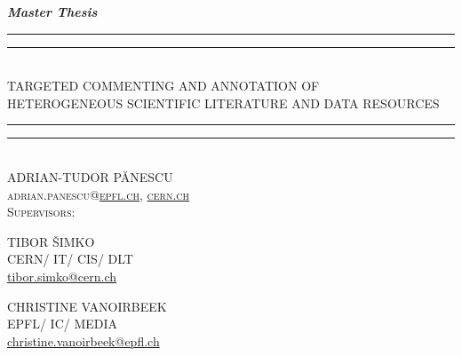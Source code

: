 
\begin{titlepage}
  \centering
  \vspace*{5\baselineskip}
  \textbf{\textit{Master Thesis}}
  \\\vspace*{\baselineskip}
  \rule{\textwidth}{1.6pt}\vspace*{-\baselineskip}\vspace*{2pt}
  \rule{\textwidth}{0.4pt}\\[\baselineskip]
  {TARGETED COMMENTING AND ANNOTATION OF\\[0.3\baselineskip] HETEROGENEOUS SCIENTIFIC LITERATURE AND DATA RESOURCES}
  \rule{\textwidth}{0.4pt}\vspace*{-\baselineskip}\vspace{3.2pt}
  \rule{\textwidth}{1.6pt}\\[\baselineskip]
  \scshape
  \vspace*{2\baselineskip}
  ADRIAN-TUDOR P\u{A}NESCU\\
  adrian.panescu@\href{mailto:adrian.panescu@epfl.ch}{epfl.ch},
                 \href{mailto:adrian.panescu@cern.ch}{cern.ch}
  \\\vspace*{4\baselineskip}
  Supervisors:
  \\\vspace*{1\baselineskip}
  \begin{minipage}{0.4\textwidth}
    \centering
    TIBOR \v{S}IMKO\\
    CERN/ IT/ CIS/ DLT\\
    \href{mailto:tibor.simko@cern.ch}{tibor.simko@cern.ch}
  \end{minipage}
  \begin{minipage}{0.4\textwidth}
    \centering
    CHRISTINE VANOIRBEEK\\
    EPFL/ IC/ MEDIA\\
    \href{mailto:christine.vanoirbeek@epfl.ch}{christine.vanoirbeek@epfl.ch}
  \end{minipage}
  \vfill
  \begin{minipage}{0.4\textwidth}
    \centering

\end{minipage}
\end{titlepage}
